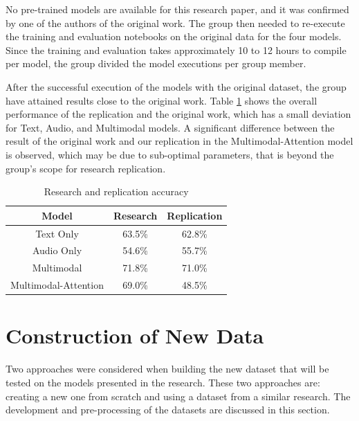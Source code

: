 \documentclass{article}
\newenvironment{subs}
  {\adjustwidth{3em}{0pt}}
  {\endadjustwidth}
\begin{document}
\begin{subs}
    No pre-trained models are available for this research paper, and it was confirmed by one of the authors of the original work. The group then needed to re-execute the training and evaluation notebooks on the original data for the four models. Since the training and evaluation takes approximately 10 to 12 hours to compile per model, the group divided the model executions per group member.\par
    
    After the successful execution of the models with the original dataset, the group have attained results close to the original work. Table \ref{Table_sec3.2} shows the overall performance of the replication and the original work, which has a small deviation for Text, Audio, and Multimodal models. A significant difference between the result of the original work and our replication in the Multimodal-Attention model is observed, which may be due to sub-optimal parameters, that is beyond the group's scope for research replication.
    \end{subs}
    
    \begin{table}[H]
        \centering
        \begin{tabular}{|   c   c   c |}
        \hline
        Model & Research & Replication \\
        \hline
        Text Only & 63.5\% & 62.8\% \\
        Audio Only & 54.6\% & 55.7\% \\
        Multimodal & 71.8\% & 71.0\% \\
        Multimodal-Attention & 69.0\% & 48.5\%\\
        \hline
        \end{tabular}
        \caption{Research and replication accuracy}
        \label{Table_sec3.2}
    \end{table}
    
\section{Construction of New Data}
Two approaches were considered when building the new dataset that will be tested on the models presented in the research. These two approaches are: creating a new one from scratch and using a dataset from a similar research. The development and pre-processing of the datasets are discussed in this section.
\end{document}
